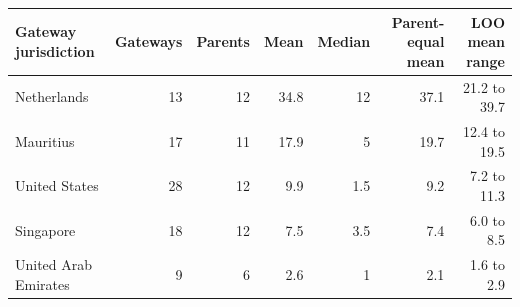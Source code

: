 \begin{tabular}{lrrrrrr}
\toprule
Gateway jurisdiction & Gateways & Parents & Mean & Median & Parent-equal mean & LOO mean range \\
\midrule
Netherlands & 13 & 12 & 34.8 & 12 & 37.1 & 21.2 to 39.7 \\
Mauritius & 17 & 11 & 17.9 & 5 & 19.7 & 12.4 to 19.5 \\
United States & 28 & 12 & 9.9 & 1.5 & 9.2 & 7.2 to 11.3 \\
Singapore & 18 & 12 & 7.5 & 3.5 & 7.4 & 6.0 to 8.5 \\
United Arab Emirates & 9 & 6 & 2.6 & 1 & 2.1 & 1.6 to 2.9 \\
\bottomrule
\end{tabular}
